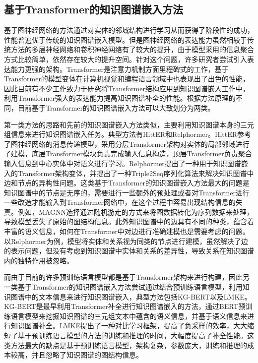 \subsection{基于Transformer的知识图谱嵌入方法}
基于图神经网络的方法通过对实体的邻域结构进行学习从而获得了阶段性的成功，性能普遍优于传统的知识图谱嵌入模型。但是图神经网络的表达能力虽然相较于传统方法的多层神经网络和卷积神经网络有了较大的提升，由于模型采用的信息聚合方式比较简单，依然存在较大的提升空间。针对这个问题，许多研究者尝试引入表达能力更强的架构。Transformer是注意力机制方面里程碑式的工作，基于Transformer的模型变体在计算机视觉和编程语言领域中也表现出了出色的性能，因此目前有不少工作致力于研究将Transformer结构应用到知识图谱嵌入工作中，利用Transformer强大的表达能力提高知识图谱补全的性能。根据方法原理的不同，目前基于Transformer的知识图谱嵌入方法可以大致划分为两类。

第一类方法的思路和先前的知识图谱嵌入方法类似，主要利用知识图谱本身的三元组信息来进行知识图谱嵌入任务。典型方法有HittER和Relphormer。HittER参考了图神经网络的消息传递模型，采用分层Transformer架构对实体的局部邻域进行了建模，底层Transformer模块负责完成输入信息构造，顶层Transformer负责聚合输入信息到中心实体中对语义进行学习。Relphormer提出了一种用于知识图谱嵌入的Transformer架构变体，并提出了一种Triple2Seq序列化算法来解决知识图谱中边和节点的异构性问题。这类基于Transformer的知识图谱嵌入方法最大的问题是知识图谱中的节点是无序的，需要进行一些额外的预处理或者对Transformer进行一些改造才能输入到Transformer网络中，在这个过程中容易出现结构信息的失真。例如，MAGNN选择通过随机游走的方式来将图数据转化为序列数据来处理，导致模型丢失了原始的图结构信息。此外知识图谱中的边具有不同的种类，蕴含着丰富的语义信息，如何在Transformer中对边进行准确建模也是需要考虑的问题。以Relphormer为例，模型将实体和关系视为同类的节点进行建模，虽然解决了边的表示问题，但没有考虑到知识图谱中实体和关系的差异性，导致关系在知识图谱内的独特作用被忽略。

而由于目前的许多预训练语言模型都是基于Transformer架构来进行构建，因此另一类基于Transformer的知识图谱嵌入方法尝试通过结合预训练语言模型，利用知识图谱中的文本信息来进行知识图谱嵌入，典型方法包括KG-BERT以及LMKE。KG-BERT是最早利用Transformer补全进行知识图谱嵌入的方法，通过BERT预训练语言模型来挖掘知识图谱的三元组文本中蕴含的语义信息，并基于语义信息来进行知识图谱补全。LMKE提出了一种对比学习框架，提高了负采样的效率，大大缩短了基于预训练语言模型的方法的训练和推理的时间，大幅度提高了补全性能。这类方法最大的缺点是基于预训练语言模型，架构复杂，参数庞大，训练和推理的成本较高，并且忽略了知识图谱的图结构信息。

